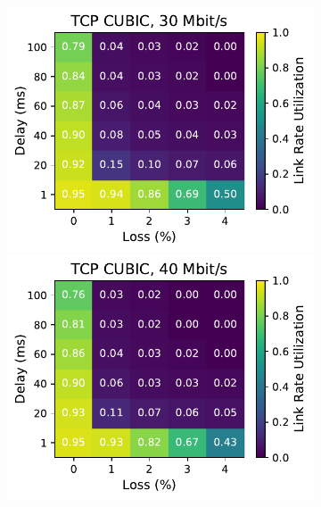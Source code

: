 \begin{figure}[ht]
\begin{subfigure}[b]{0.22\linewidth}
        \includegraphics[width=\linewidth,trim={0 0 2cm 0},clip]{splitting/figures/heatmaps/heatmap_tcp_cubic_30mbps.pdf}
        \includegraphics[width=\linewidth,trim={0 0 2cm 0},clip]{splitting/figures/heatmaps/heatmap_tcp_cubic_40mbps.pdf}

\end{subfigure}
\end{figure}
